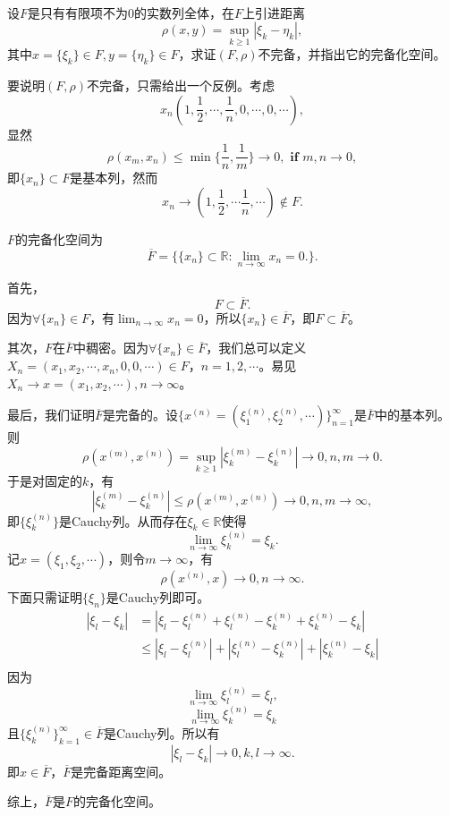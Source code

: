 \begin{exercise}
\hfill\\
设$F$是只有有限项不为0的实数列全体，在$F$上引进距离
$$\rho(x,y)=\sup_{k\geq1}|\xi_k-\eta_k|,$$
其中$x=\{\xi_k\}\in F,y=\{\eta_k\}\in F$，求证$(F,\rho)$不完备，并指出它的完备化空间。

要说明$(F,\rho)$不完备，只需给出一个反例。考虑$$x_n(1,\frac{1}{2},\cdots,\frac{1}{n},0,\cdots,0,\cdots),$$
显然$$\rho(x_m,x_n)\leq\min\{\frac{1}{n},\frac{1}{m}\}\rightarrow0,\textbf{ if }m,n\rightarrow0,$$
即$\{x_n\}\subset F$是基本列，然而
$$x_n\rightarrow(1,\frac{1}{2},\cdots\frac{1}{n},\cdots)\not\in F.$$

$F$的完备化空间为
$$\overline{F}=\{\{x_n\}\subset\mathbb{R}:\lim_{n\rightarrow\infty}x_n=0.\}.$$

首先，$$F\subset\overline{F}.$$
因为$\forall\{x_n\}\in F$，有$\lim_{n\rightarrow\infty}x_n=0$，所以$\{x_n\}\in\overline{F}$，即$F\subset\overline{F}$。

其次，$F$在$\overline{F}$中稠密。因为$\forall\{x_n\}\in\overline{F}$，我们总可以定义$X_n=(x_1,x_2,\cdots,x_n,0,0,\cdots)\in F$，$n=1,2,\cdots$。易见$X_n\rightarrow x=(x_1,x_2,\cdots),n\rightarrow\infty$。

最后，我们证明$\overline{F}$是完备的。设$\{x^{(n)}=(\xi_1^{(n)},\xi_2^{(n)},\cdots)\}_{n=1}^{\infty}$是$\overline{F}$中的基本列。则$$\rho(x^{(m)},x^{(n)})=\sup_{k\geq1}|\xi_k^{(m)}-\xi_k^{(n)}|\rightarrow0,n,m\rightarrow0.$$
于是对固定的$k$，有
$$|\xi_k^{(m)}-\xi_k^{(n)}|\leq\rho(x^{(m)},x^{(n)})\rightarrow0,n,m\rightarrow\infty,$$
即$\{\xi_k^{(n)}\}$是Cauchy列。从而存在$\xi_k\in\mathbb{R}$使得$$\lim_{n\rightarrow\infty}\xi_k^{(n)}=\xi_k.$$
记$x=(\xi_1,\xi_2,\cdots)$，则令$m\rightarrow\infty$，有
$$\rho(x^{(n)},x)\rightarrow0,n\rightarrow\infty.$$
下面只需证明$\{\xi_n\}$是Cauchy列即可。
\begin{align*}
|\xi_l-\xi_k|&=|\xi_l-\xi_l^{(n)}+\xi_l^{(n)}-\xi_k^{(n)}+\xi_k^{(n)}-\xi_k|\\
&\leq|\xi_l-\xi_l^{(n)}|+|\xi_l^{(n)}-\xi_k^{(n)}|+|\xi_k^{(n)}-\xi_k|\\
\end{align*}
因为$$\lim_{n\rightarrow\infty}\xi_l^{(n)}=\xi_l,$$$$\lim_{n\rightarrow\infty}\xi_k^{(n)}=\xi_k$$
且$\{\xi_k^{(n)}\}_{k=1}^{\infty}\in\overline{F}$是Cauchy列。所以有
$$|\xi_l-\xi_k|\rightarrow0,k,l\rightarrow\infty.$$
即$x\in\overline{F}$，$\overline{F}$是完备距离空间。

综上，$\overline{F}$是$F$的完备化空间。
\end{exercise}

